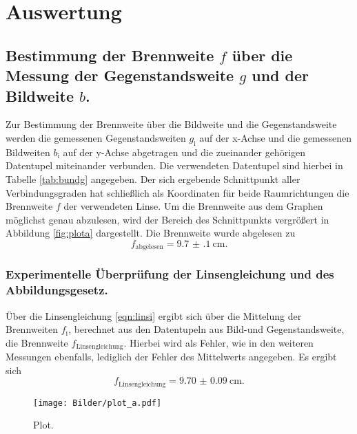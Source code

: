 \section{Auswertung}
\label{sec:Auswertung}
\subsection{Bestimmung der Brennweite $f$ über die Messung der Gegenstandsweite $g$ und der Bildweite $b$.}
Zur Bestimmung der Brennweite über die Bildweite und die Gegenstandsweite werden die gemessenen Gegenstandsweiten $g_{\mathrm{i}}$ auf der x-Achse und die gemessenen Bildweiten $b_{\mathrm{i}}$ auf der y-Achse abgetragen und die zueinander gehörigen Datentupel miteinander verbunden.
Die verwendeten Datentupel sind hierbei in Tabelle \ref{tab:bundg} angegeben.
Der sich ergebende Schnittpunkt aller Verbindungsgraden hat schließlich als Koordinaten für beide Raumrichtungen die Brennweite $f$ der verwendeten Linse. Um die Brennweite aus dem Graphen möglichst genau abzulesen, wird der Bereich des Schnittpunkts vergrößert in Abbildung \ref{fig:plota} dargestellt.
Die Brennweite wurde abgelesen zu
\begin{equation}
  f_{\mathrm{abgelesen}}=\SI{9.7(1)}{\centi\meter}\text{.}
\end{equation}
\subsubsection{Experimentelle Überprüfung der Linsengleichung und des Abbildungsgesetz.}
Über die Linsengleichung \eqref{eqn:linsi} ergibt sich über die Mittelung der Brennweiten $f_{\mathrm{i}}$, berechnet aus den Datentupeln aus Bild-und Gegenstandsweite, die Brennweite $f_{\mathrm{Linsengleichung}}$.
Hierbei wird als Fehler, wie in den weiteren Messungen ebenfalls, lediglich der Fehler des Mittelwerts angegeben.
Es ergibt sich
\begin{equation}
  f_{\mathrm{Linsengleichung}}=\SI{9.70(9)}{\centi\meter}\text{.}
\end{equation}

\begin{figure}
  \centering
  \texttt{[image: Bilder/plot\_a.pdf]}
  \caption{Plot.}
  \label{fig:plot}
\end{figure}



